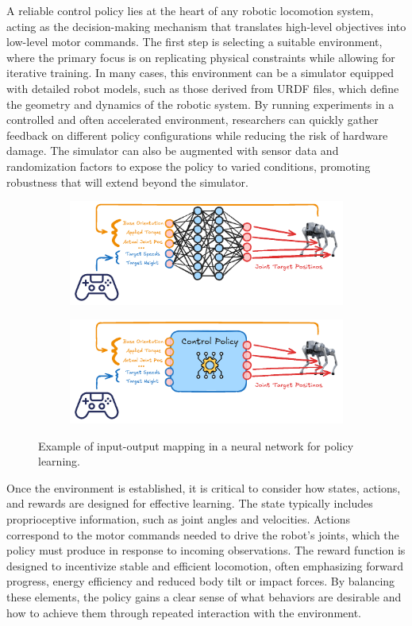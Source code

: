 A reliable control policy lies at the heart of any robotic locomotion system, acting as the decision-making mechanism that translates high-level objectives into low-level motor commands. The first step is selecting a suitable environment, where the primary focus is on replicating physical constraints while allowing for iterative training. In many cases, this environment can be a simulator equipped with detailed robot models, such as those derived from URDF files, which define the geometry and dynamics of the robotic system. By running experiments in a controlled and often accelerated environment, researchers can quickly gather feedback on different policy configurations while reducing the risk of hardware damage. The simulator can also be augmented with sensor data and randomization factors to expose the policy to varied conditions, promoting robustness that will extend beyond the simulator.

\begin{figure}[htbp]
	\centering
	\begin{subfigure}{0.45\linewidth}
		\centering
		\includegraphics[width=0.9\linewidth]{fig/policyaa_1}
	\end{subfigure}
	\centering
	\begin{subfigure}{0.45\linewidth}
		\centering
		\includegraphics[width=0.9\linewidth]{fig/policyaa_2}
	\end{subfigure}
	\caption{Example of input-output mapping in a neural network for policy learning.}
\end{figure}

Once the environment is established, it is critical to consider how states, actions, and rewards are designed for effective learning. The state typically includes proprioceptive information, such as joint angles and velocities. Actions correspond to the motor commands needed to drive the robot’s joints, which the policy must produce in response to incoming observations. The reward function is designed to incentivize stable and efficient locomotion, often emphasizing forward progress, energy efficiency and reduced body tilt or impact forces. By balancing these elements, the policy gains a clear sense of what behaviors are desirable and how to achieve them through repeated interaction with the environment.

